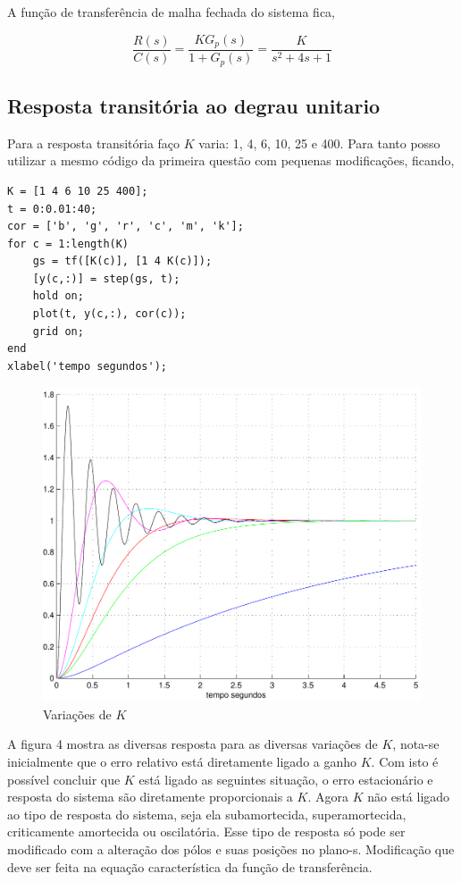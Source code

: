 \documentclass[paper=a4, fontsize=11pt]{article}
\begin{document}
A função de transferência de malha fechada do sistema fica,

\begin{equation}
    \frac{R(s)}{C(s)} = \frac{K G_p(s)}{1 + G_p(s)} = \frac{K}{s^2 + 4 s + 1}
\end{equation}

\subsection{Resposta transitória ao degrau unitario}

Para a resposta transitória faço $K$ varia: 1, 4, 6, 10, 25 e 400. Para tanto
posso utilizar a mesmo código da primeira questão com pequenas modificações, ficando,

\begin{lstlisting}
K = [1 4 6 10 25 400];
t = 0:0.01:40;
cor = ['b', 'g', 'r', 'c', 'm', 'k'];
for c = 1:length(K)
    gs = tf([K(c)], [1 4 K(c)]);
    [y(c,:)] = step(gs, t);
    hold on;
    plot(t, y(c,:), cor(c));
    grid on;
end
xlabel('tempo segundos');
\end{lstlisting}


\begin{figure}
    \begin{center}
    \includegraphics[scale=.5]{q4ia.pdf}
    \caption{Variações de $K$}
    \end{center}
\end{figure}

A figura 4 mostra as diversas resposta para as diversas variações
de $K$, nota-se inicialmente que o erro relativo está diretamente ligado 
a ganho $K$. Com isto é possível concluir que $K$ está ligado as seguintes 
situação, o erro estacionário e resposta do sistema são diretamente proporcionais
a $K$. Agora $K$ não está ligado ao tipo de resposta do sistema, seja ela 
subamortecida, superamortecida, criticamente amortecida ou oscilatória. Esse
tipo de resposta só pode ser modificado com a alteração dos pólos e suas posições
no plano-s. Modificação que deve ser feita na equação característica da função 
de transferência. 
\end{document}
